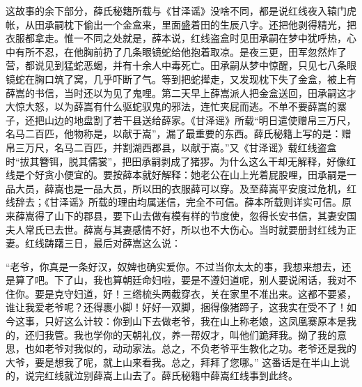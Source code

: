 这故事的余下部分，薛氏秘籍所载与《甘泽谣》没啥不同，都是说红线夜入辕门虎帐，从田承嗣枕下偷出一个金盒来，里面盛着田的生辰八字。还把他剥得精光，把衣服都拿走。惟一不同之处就是，薛本说，红线盗盒时见田承嗣在梦中犹呼热，心中有所不忍，在他胸前扔了几条眼镜蛇给他抱着取凉。是夜三更，田军忽然炸了营，都说见到猛蛇恶蝎，并有十余人中毒死亡。田承嗣从梦中惊醒，只见七八条眼镜蛇在胸口筑了窝，几乎吓断了气。等到把蛇撵走，又发现枕下失了金盒，被上有薛嵩的书信，当时还以为见了鬼哩。第二天早上薛嵩派人把金盒送回，田承嗣这才大惊大怒，以为薛嵩有什么驱蛇驭鬼的邪法，连忙夹屁而逃。不单不要薛嵩的寨子，还把山边的地盘割了若干县送给薛家。《甘泽谣》所载“明日遣使赠帛三万尺，名马二百匹，他物称是，以献于嵩”，漏了最重要的东西。薛氏秘籍上写的是：赠帛三万尺，名马二百匹，并割湖西郡县，以献于嵩。”又《甘泽谣》载红线盗盒时“拔其簪铒，脱其儒裳”，把田承嗣剥成了猪猡。为什么这么干却无解释，好像红线是个好贪小便宜的。要按薛本就好解释：她老公在山上光着屁股哩，田承嗣是一品大员，薛嵩也是一品大员，所以田的衣服薛可以穿。及至薛嵩平安度过危机，红线辞去；《甘泽谣》所载的理由均属迷信，完全不可信。薛本所载则详实可信。原来薛嵩得了山下的郡县，要下山去做有模有样的节度使，忽得长安书信，其妻安国夫人常氏已去世。薛嵩与其妻感情不好，所以也不大伤心。当时就要册封红线为正妻。红线踌躇三日，最后对薛嵩这么说： 

“老爷，你真是一条好汉，奴婢也确实爱你。不过当你太太的事，我想来想去，还是算了吧。下了山，我也算朝廷命妇啦，要是不遵妇道呢，别人要说闲话，我对不住你。要是克守妇道，好！三绺梳头两截穿衣，关在家里不准出来。这都不要紧，谁让我爱老爷呢？还得裹小脚！好好一双脚，捆得像猪蹄子，这我实在受不了！如今这事，只好这么计较：你到山下去做老爷，我在山上称老娘，这凤凰寨原本是我的，还归我管。我也学你的天朝礼仪，养一帮奴才，叫他们跪拜我。拗了我的意思，也如老爷对我似的，动动家法。总之，不负老爷平生教化之功。老爷还是我的大爷，要是想我了呢，就上山来看我。总之，拜拜了您哪。” 这番话是在半山上说的，说完红线就泣别薛嵩上山去了。薛氏秘籍中薛嵩红线事到此终。
